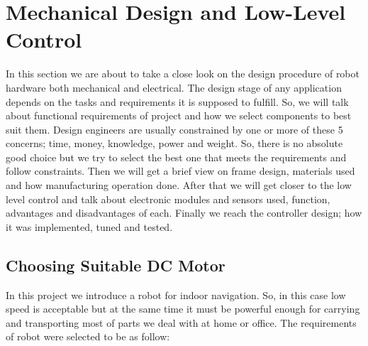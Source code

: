 \documentclass[12pt]{article}
\begin{document}
\section{Mechanical Design and Low-Level Control}
In this section we are about to take a close look on the design procedure of robot hardware both mechanical and electrical. The design stage of any application depends on the tasks and requirements it is supposed to fulfill. So, we will talk about functional requirements of project and how we select components to best suit them. Design engineers are usually constrained by one or more of these 5 concerns; time, money, knowledge, power and weight. So, there is no absolute good choice but we try to select the best one that meets the requirements and follow constraints. \cite{203} Then we will get a brief view on frame design, materials used and how manufacturing operation done. After that we will get closer to the low level control and talk about electronic modules and sensors used, function, advantages and disadvantages of each. Finally we reach the controller design; how it was implemented, tuned and tested.  

\subsection{Choosing Suitable DC Motor  \cite{203}}
In this project we introduce a robot for indoor navigation. So, in this case low speed is acceptable but at the same time it must be powerful enough for carrying and transporting most of parts we deal with at home or office. The requirements of robot were selected to be as follow:
\end{document}
